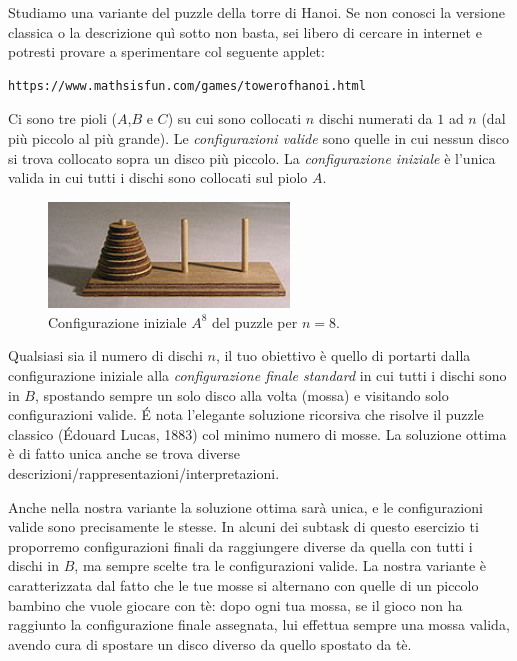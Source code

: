 \renewcommand{\nomebreve}{hanoi\_with\_toddler}
\renewcommand{\titolo}{Playing the Hanoi puzzle with a toddler\\}

\introduzione{}

Studiamo una variante del puzzle della torre di Hanoi. Se non conosci la versione classica o la descrizione quì sotto non basta, sei libero di cercare in internet e potresti provare a sperimentare col seguente applet:

\begin{verbatim}
https://www.mathsisfun.com/games/towerofhanoi.html
\end{verbatim}

Ci sono tre pioli ($A$,$B$ e $C$) su cui sono collocati $n$ dischi numerati da $1$ ad $n$ (dal più piccolo al più grande). Le \emph{configurazioni valide} sono quelle in cui nessun disco si trova collocato sopra un disco più piccolo.
La \emph{configurazione iniziale} è l'unica valida in cui tutti i dischi sono collocati sul piolo $A$.

\begin{figure}[h!]
\begin{center}
  \noindent \includegraphics[width=0.57\textwidth]{figures/220px-Tower_of_Hanoi.jpeg}
\end{center}
\caption{Configurazione iniziale $A^8$ del puzzle per $n=8$.}
\end{figure}

Qualsiasi sia il numero di dischi $n$, il tuo obiettivo è quello di portarti dalla configurazione iniziale alla \emph{configurazione finale standard} in cui tutti i dischi sono in $B$, spostando sempre un solo disco alla volta (mossa) e visitando solo configurazioni valide.
\'E nota l'elegante soluzione ricorsiva che risolve il puzzle classico (Édouard Lucas, 1883) col minimo numero di mosse. La soluzione ottima è di fatto unica anche se trova diverse descrizioni/rappresentazioni/interpretazioni.

Anche nella nostra variante la soluzione ottima sarà unica, e le configurazioni valide sono precisamente le stesse. In alcuni dei subtask di questo esercizio ti proporremo configurazioni finali da raggiungere diverse da quella con tutti i dischi in $B$, ma sempre scelte tra le configurazioni valide. La nostra variante è caratterizzata dal fatto che le tue mosse si alternano con quelle di un piccolo bambino che vuole giocare con tè: dopo ogni tua mossa, se il gioco non ha raggiunto la configurazione finale assegnata, lui effettua sempre una mossa valida, avendo cura di spostare un disco diverso da quello spostato da tè.\\

